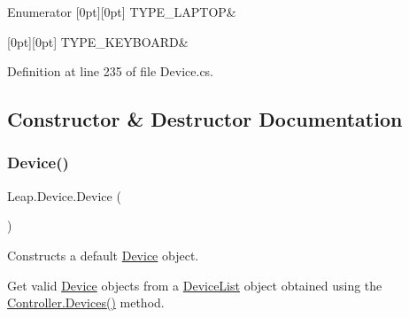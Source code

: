 \begin{DoxyEnumFields}{Enumerator}
[0pt][0pt]{}\mbox{\label{class_leap_1_1_device_acbae26ae873dec763876ed257b38456faf66ee867466be4d1e2f97607e7107873}} 
T\+Y\+P\+E\+\_\+\+L\+A\+P\+T\+OP&\\
\hline

[0pt][0pt]{}\mbox{\label{class_leap_1_1_device_acbae26ae873dec763876ed257b38456fa994cb90fbc17743966246915db45862a}} 
T\+Y\+P\+E\+\_\+\+K\+E\+Y\+B\+O\+A\+RD&\\
\hline

\end{DoxyEnumFields}


Definition at line 235 of file Device.\+cs.



\subsection{Constructor \& Destructor Documentation}
\mbox{\label{class_leap_1_1_device_a074c5d121d3c6f2cb63046bd6a14efa5}} 
\subsubsection{\texorpdfstring{Device()}{Device()}\hspace{0.1cm}{\footnotesize\ttfamily [1/2]}}
{\footnotesize\ttfamily Leap.\+Device.\+Device (\begin{DoxyParamCaption}{ }\end{DoxyParamCaption})}



Constructs a default \mbox{\hyperlink{class_leap_1_1_device}{Device}} object. 

Get valid \mbox{\hyperlink{class_leap_1_1_device}{Device}} objects from a \mbox{\hyperlink{class_leap_1_1_device_list}{Device\+List}} object obtained using the \mbox{\hyperlink{class_leap_1_1_controller_aa5e641f54418e5194161ac45dc15c7fb}{Controller.\+Devices()}} method.

